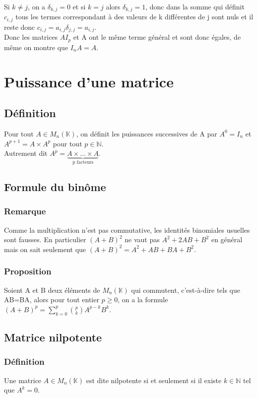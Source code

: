 \documentclass[a4paper,10pt]{book} %
\newcommand{\N}{\mathbb{N}}
\newcommand{\K}{\mathbb{K}}
\begin{document}
Si $k\neq j$, on a $\delta_{k,j}=0$ et si $k=j$ alors $\delta_{k,j}=1$, donc dans la somme qui définit $c_{i,j}$ tous les termes correspondant à des valeurs de k différentes de j sont nuls et il reste donc $c_{i,j}=a_{i,j}\delta_{j,j}=a_{i,j}$.\\

Donc les matrices $AI_{p}$ et A ont le même terme général et sont donc égales, de même on montre que $I_{n}A=A$.

\newpage

\section{Puissance d'une matrice}
\subsection{Définition}
Pour tout $A\in M_{n}(\K)$, on définit les puissances successives de A par $A^{0}=I_{n}$ et $A^{p+1}=A\times A^{p}$ pour tout $p\in \N$.\\
Autrement dit $A^{p}=\underbrace{A\times ...\times A}_{\text{p facteurs}}$.

\subsection{Formule du binôme}
\subsubsection{Remarque}
Comme la multiplication n'est pas commutative, les identités binomiales usuelles sont fausses. En particulier $(A+B)^{2}$ ne vaut pas $A^{2}+2AB+B^{2}$ en général mais on sait seulement que $(A+B)^{2}=A^{2}+AB+BA+B^{2}$.

\subsubsection{Proposition}
Soient A et B deux éléments de $M_{n}(\K)$ qui commutent, c'est-à-dire tels que AB=BA, alors pour tout entier $p\geq 0$, on a la formule $(A+B)^{p}=\sum\limits_{k=0}^{p}\binom{p}{k}A^{p-k}B^{k}$.

\subsection{Matrice nilpotente}
\subsubsection{Définition}
Une matrice $A \in M_{n}(\K)$ est dite nilpotente si et seulement si il existe $k\in \N$ tel que $A^{k}=0$.
\end{document}
